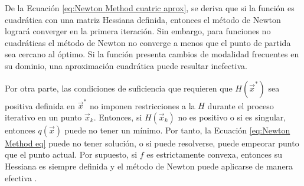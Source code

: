 De la Ecuación \ref{eq:Newton Method cuatric aprox}, se deriva que si la función es cuadrática con una matriz Hessiana definida, entonces el método de Newton logrará converger en la primera iteración. Sin embargo, para funciones no cuadráticas el método de Newton no converge a menos que el punto de partida sea cercano al óptimo. Si la función presenta cambios de modalidad frecuentes en su dominio, una aproximación cuadrática puede resultar inefectiva. 

Por otra parte, las condiciones de suficiencia que requieren que $H (\vec{x}^*)$ sea positiva definida en $\vec{x}^*$ no imponen restricciones a la $H$ durante el proceso iterativo en un punto $\vec{x}_k$.  Entonces, si  $H (\vec{x}_k)$ no es positivo o si es singular, entonces $q (\vec{x})$ puede no tener un mínimo. Por tanto, la Ecuación \ref{eq:Newton Method eq} puede no tener solución, o si puede resolverse, puede empeorar punto que el punto actual. Por supuesto, si $f$ es estrictamente convexa, entonces su Hessiana es siempre definida y el método de Newton puede aplicarse de manera efectiva \cite{belegundu_optimization_2011}.
